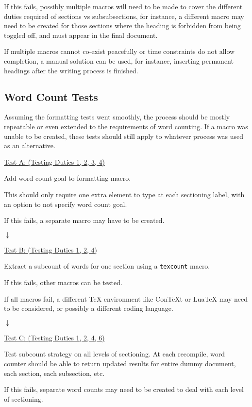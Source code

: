 \documentclass[12pt]{article}
\begin{document}
If this fails, possibly multiple macros will need to be made to cover the different duties required of sections vs subsubsections, for instance, a different macro may need to be created for those sections where the heading is forbidden from being toggled off, and must appear in the final document.

If multiple macros cannot co-exist peacefully or time constraints do not allow completion, a manual solution can be used, for instance, inserting permanent headings after the writing process is finished.

\vspace{2em}
\subsection*{Word Count Tests}

Assuming the formatting tests went smoothly, the process should be mostly repeatable or even extended to the requirements of word counting. If a macro was unable to be created, these tests should still apply to whatever process was used as an alternative.

\underline{Test A: (Testing Duties 1, 2, 3, 4)}

Add word count goal to formatting macro.

This should only require one extra element to type at each sectioning label, with an option to not specify word count goal.

If this fails, a separate macro may have to be created.

$\downarrow$

\underline{Test B: (Testing Duties 1, 2, 4)}

Extract a subcount of words for one section using a \texttt{texcount} macro.

If this fails, other macros can be tested.

If all macros fail, a different TeX environment like ConTeXt or LuaTeX may need to be considered, or possibly a different coding language. 

$\downarrow$

\underline{Test C: (Testing Duties 1, 2, 4, 6)}

Test subcount strategy on all levels of sectioning. At each recompile, word counter should be able to return updated results for entire dummy document, each section, each subsection, etc.

If this fails, separate word counts may need to be created to deal with each level of sectioning.
\end{document}
